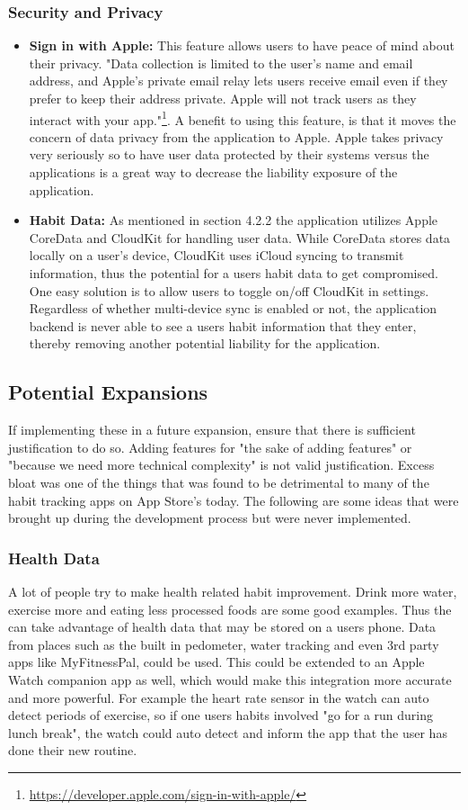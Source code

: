 \subsubsection{Security and Privacy}
\begin{itemize}
    \item \textbf{Sign in with Apple:} This feature allows users to have peace of mind about their privacy. "Data collection is limited to the user’s name and email address, and Apple’s private email relay lets users receive email even if they prefer to keep their address private. Apple will not track users as they interact with your app."\footnote{\url{https://developer.apple.com/sign-in-with-apple/}}. A benefit to using this feature, is that it moves the concern of data privacy from the application to Apple. Apple takes privacy very seriously so to have user data protected by their systems versus the applications is a great way to decrease the liability exposure of the application.
    \item \textbf{Habit Data:} As mentioned in section 4.2.2 the application utilizes Apple CoreData and CloudKit for handling user data. While CoreData stores data locally on a user's device, CloudKit uses iCloud syncing to transmit information, thus the potential for a users habit data to get compromised. One easy solution is to allow users to toggle on/off CloudKit in settings. Regardless of whether multi-device sync is enabled or not, the application backend is never able to see a users habit information that they enter, thereby removing another potential liability for the application.
\end{itemize}

\subsection{Potential Expansions}
If implementing these in a future expansion, ensure that there is sufficient justification to do so. Adding features for "the sake of adding features" or "because we need more technical complexity" is not valid justification. Excess bloat was one of the things that was found to be detrimental to many of the habit tracking apps on App Store's today. The following are some ideas that were brought up during the development process but were never implemented.
\subsubsection{Health Data}
A lot of people try to make health related habit improvement. Drink more water, exercise more and eating less processed foods are some good examples. Thus the can take advantage of health data that may be stored on a users phone. Data from places such as the built in pedometer, water tracking and even 3rd party apps like MyFitnessPal, could be used. This could be extended to an Apple Watch companion app as well, which would make this integration more accurate and more powerful. For example the heart rate sensor in the watch can auto detect periods of exercise, so if one users habits involved "go for a run during lunch break", the watch could auto detect and inform the app that the user has done their new routine.
